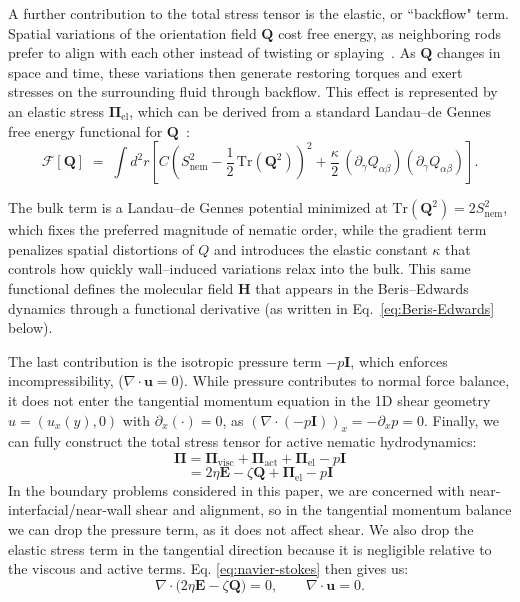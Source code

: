 \documentclass[11pt]{article}
\begin{document}
A further contribution to the total stress tensor is the elastic, or ``backflow" term. Spatial variations of the orientation field $\mathbf{Q}$ cost free energy, as neighboring rods prefer to align with each other instead of twisting or splaying~\cite{degennes1993physics}. As $\mathbf{Q}$ changes in space and time, these variations then generate restoring torques and exert stresses on the surrounding fluid through backflow. This effect is represented by an elastic stress $\boldsymbol{\Pi}_{\mathrm{el}}$, which can be derived from a standard Landau--de Gennes free energy functional for $\mathbf{Q}$~\cite{degennes1993physics, Bhattacharyya2024ActiveNematicsMechanobiology, beris1994thermodynamics}:
\begin{equation}
\mathcal{F}[\mathbf{Q}] \;=\; \int d^{2}r \left[
C\left(S_{\mathrm{nem}}^{2}-\frac{1}{2}\,\mathrm{Tr}\!\left(\mathbf{Q}^{2}\right)\right)^{2}
+\frac{\kappa}{2}\,(\partial_\gamma Q_{\alpha\beta})(\partial_\gamma Q_{\alpha\beta})
\right].
\label{eq:free_energy}
\end{equation}

The bulk term is a Landau--de Gennes potential minimized at $\mathrm{Tr}(\mathbf{Q}^2)=2S_{\mathrm{nem}}^2$, which fixes the preferred magnitude of nematic order, while the gradient term penalizes spatial distortions of $Q$ and introduces the elastic constant $\kappa$ that controls how quickly wall--induced variations relax into the bulk. This same functional defines the molecular field $\mathbf{H}$ that appears in the Beris--Edwards dynamics through a functional derivative (as written in Eq.~\eqref{eq:Beris-Edwards} below).

The last contribution is the isotropic pressure term $-p \mathbf{I}$, which enforces incompressibility, \mbox{($\nabla\cdot\mathbf{u}=0$)}. While pressure contributes to normal force balance, it does not enter the tangential momentum equation in the 1D shear geometry $u=(u_x(y),0)$ with $\partial_x(\cdot)=0$, as $(\nabla\cdot(-p\mathbf{I}))_x = -\partial_x p = 0$.
Finally, we can fully construct the total stress tensor for active nematic hydrodynamics:
$$\boldsymbol{\Pi} = \boldsymbol{\Pi}_{\text{visc}} + \boldsymbol{\Pi}_{\text{act}}+\boldsymbol{\Pi}_{\text{el}}-p\mathbf{I}$$
\begin{equation}
    = 2\eta\mathbf{E} - \zeta\mathbf{Q} + \boldsymbol{\Pi}_{\mathrm{el}} -p\mathbf{I}
\end{equation}
In the boundary problems considered in this paper, we are concerned with near-interfacial/near-wall shear and alignment, so in the tangential momentum balance we can drop the pressure term, as it does not affect shear. We also drop the elastic stress term in the tangential direction because it is negligible relative to the viscous and active terms. Eq. \eqref{eq:navier-stokes} then gives us: 
\begin{equation}
\nabla\!\cdot\!\big(2\eta\mathbf{E}-\zeta\mathbf{Q}\big)=0,
\qquad
\nabla\!\cdot\!\mathbf{u}=0.
\end{equation}
\end{document}

